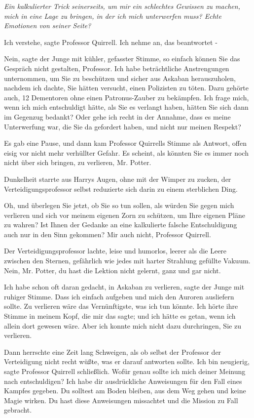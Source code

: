 \emph{Ein kalkulierter Trick seinerseits, um mir ein schlechtes Gewissen zu machen, mich in eine Lage zu bringen, in der ich mich unterwerfen muss? Echte Emotionen von seiner Seite?}

\glqq Ich verstehe\grqq{}, sagte Professor Quirrell. \glqq Ich nehme an, das
beantwortet -\grqq{}

\glqq Nein\grqq{}, sagte der Junge mit kühler, gefasster Stimme, \glqq so
einfach können Sie das Gespräch nicht gestalten, Professor. Ich habe
beträchtliche Anstrengungen unternommen, um Sie zu beschützen und sicher aus
Askaban herauszuholen, nachdem ich dachte, Sie hätten versucht, einen Polizisten
zu töten. Dazu gehörte auch, 12 Dementoren ohne einen Patronus-Zauber zu
bekämpfen. Ich frage mich, wenn ich mich entschuldigt hätte, als Sie es verlangt
haben, hätten Sie sich dann im Gegenzug bedankt? Oder gehe ich recht in der
Annahme, dass es meine Unterwerfung war, die Sie da gefordert haben, und nicht
nur meinen Respekt?\grqq{}

Es gab eine Pause, und dann kam Professor Quirrells Stimme als Antwort, offen
eisig vor nicht mehr verhüllter Gefahr. \glqq Es scheint, als könnten Sie es
immer noch nicht über sich bringen, zu verlieren, Mr. Potter.\grqq{}

Dunkelheit starrte aus Harrys Augen, ohne mit der Wimper zu zucken, der
Verteidigungsprofessor selbst reduzierte sich darin zu einem sterblichen Ding.

\glqq Oh, und überlegen Sie jetzt, ob Sie so tun sollen, als würden Sie gegen
mich verlieren und sich vor meinem eigenen Zorn zu schützen, um Ihre eigenen
Pläne zu wahren? Ist Ihnen der Gedanke an eine kalkulierte falsche
Entschuldigung auch nur in den Sinn gekommen? Mir auch nicht, Professor
Quirrell.\grqq{}

Der Verteidigungsprofessor lachte, leise und humorlos, leerer als die Leere
zwischen den Sternen, gefährlich wie jedes mit harter Strahlung gefüllte Vakuum.
\glqq Nein, Mr. Potter, du hast die Lektion nicht gelernt, ganz und gar
nicht.\grqq{}

\glqq Ich habe schon oft daran gedacht, in Askaban zu verlieren\grqq{}, sagte
der Junge mit ruhiger Stimme. \glqq Dass ich einfach aufgeben und mich den
Auroren ausliefern sollte. Zu verlieren wäre das Vernünftigste, was ich tun
könnte. Ich hörte ihre Stimme in meinem Kopf, die mir das sagte; und ich hätte
es getan, wenn ich allein dort gewesen wäre. Aber ich konnte mich nicht dazu
durchringen, Sie zu verlieren.\grqq{}

Dann herrschte eine Zeit lang Schweigen, als ob selbst der Professor der
Verteidigung nicht recht wüßte, was er darauf antworten sollte. \glqq Ich bin
neugierig\grqq{}, sagte Professor Quirrell schließlich. \glqq Wofür genau sollte
ich mich deiner Meinung nach entschuldigen? Ich habe dir ausdrückliche
Anweisungen für den Fall eines Kampfes gegeben. Du solltest am Boden bleiben,
aus dem Weg gehen und keine Magie wirken. Du hast diese Anweisungen missachtet
und die Mission zu Fall gebracht.\grqq{}

